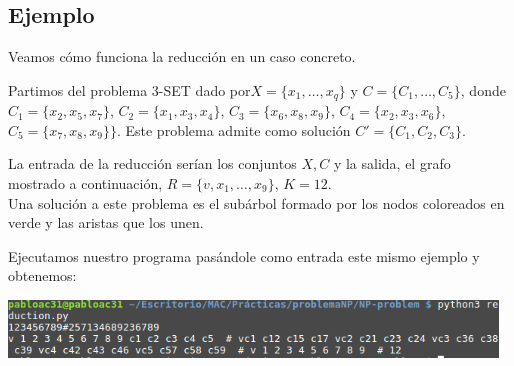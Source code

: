 \documentclass[a4paper, 11pt]{article}
\begin{document}


\subsection*{Ejemplo}
Veamos cómo funciona la reducción en un caso concreto.

Partimos del problema 3-SET dado por$X=\{x_1,\dots,x_q\}$ y $C=\{C_1,\dots,C_5\}$, donde $C_1=\{x_2, x_5, x_7\}$, $C_2=\{x_1,x_3,x_4\}$, $C_3=\{x_6,x_8,x_9\}$, $C_4=\{x_2,x_3,x_6\}$, $C_5=\{x_7,x_8,x_9\}\}$. Este problema admite como solución $C'=\{C_1,C_2,C_3\}$.

La entrada de la reducción serían los conjuntos $X, C$ y la salida, el grafo mostrado a continuación, $R=\{v,x_1,\dots,x_9\}$, $K=12$.\\



Una solución a este problema es el subárbol formado por los nodos coloreados en verde y las aristas que los unen.

Ejecutamos nuestro programa pasándole como entrada este mismo ejemplo y obtenemos:

\includegraphics[width=13cm]{imagen}
\end{document}
